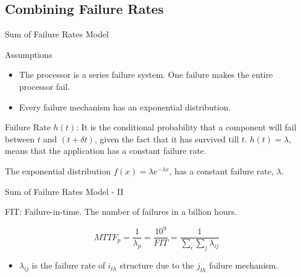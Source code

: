 \documentclass[xcolor=pdftex,dvipsnames,table,svgnames,x11names]{beamer}
\begin{document}
\subsection{Combining Failure Rates}
\begin{frame}{Sum of Failure Rates Model}
\begin{block}{Assumptions}
 \begin{itemize}
   \item The processor is a series failure system. One failure makes the entire processor fail.
  \item Every failure mechanism has an exponential distribution. 
 \end{itemize}
\end{block}
\begin{definition}{Failure Rate $h(t)$: }
 It is the conditional probability that a component will fail between $t$ and $(t + \delta t)$, given
the fact that it has survived till $t$. $h(t) = \lambda$, means that the application has a constant failure
rate.
\end{definition}
\begin{example}
 The exponential distribution $f(x) = \lambda e^{-\lambda x}$, has a constant failure rate, $\lambda$. 
\end{example}
\end{frame}

\begin{frame}{Sum of Failure Rates Model - II}
 \begin{definition}{FIT: }
  Failure-in-time. The number of failures in a billion hours.
 \end{definition}

\begin{displaymath}
 MTTF_p = \frac{1}{\lambda_p} = \frac{10^9}{FIT}=\frac{1}{\sum_i\sum_j \lambda_{ij}}
\end{displaymath}

\begin{itemize}
 \item $\lambda_{ij}$ is the failure rate of $i_{th}$ structure due to the $j_{th}$ failure mechanism.
\end{itemize}
\end{frame}
\end{document}
